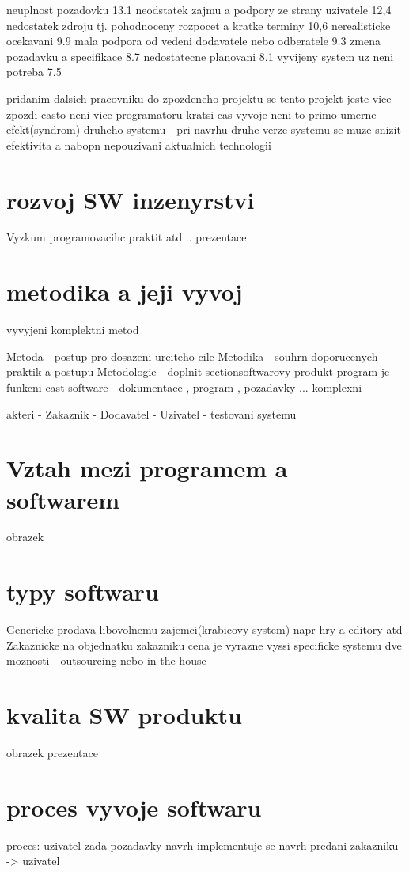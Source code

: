 \documentclass{article}
\begin{document}
neuplnost pozadovku 13.1%
neodstatek zajmu a podpory ze strany uzivatele 12,4%
nedostatek zdroju tj. pohodnoceny rozpocet a kratke terminy 10,6%
nerealisticke ocekavani 9.9%
mala podpora od vedeni dodavatele nebo odberatele 9.3%
zmena pozadavku a specifikace 8.7%
nedostatecne planovani 8.1%
vyvijeny system uz neni potreba 7.5%

pridanim dalsich pracovniku do zpozdeneho projektu se tento projekt jeste vice zpozdi
casto neni vice programatoru kratsi cas vyvoje neni to primo umerne
efekt(syndrom) druheho systemu - pri navrhu druhe verze systemu se muze snizit
efektivita a nabopn
nepouzivani aktualnich technologii
\section{rozvoj SW inzenyrstvi}
Vyzkum programovacihc praktit
atd .. prezentace
\section{metodika a jeji vyvoj}
vyvyjeni komplektni metod

Metoda - postup pro dosazeni urciteho cile
Metodika - souhrn doporucenych praktik a postupu
Metodologie - doplnit
section{softwarovy produkt}
program je funkcni cast
software -  dokumentace , program , pozadavky ... komplexni

akteri - Zakaznik
       - Dodavatel
       - Uzivatel - testovani systemu
\section{Vztah mezi programem a softwarem}
obrazek
\section{typy softwaru}
Genericke
    prodava libovolnemu zajemci(krabicovy system) napr hry a editory atd
Zakaznicke
    na objednatku zakazniku cena je vyrazne vyssi
    specificke systemu
    dve moznosti - outsourcing nebo in the house
\section{kvalita SW produktu}
obrazek prezentace
\section{proces vyvoje softwaru}
proces:
    uzivatel zada pozadavky
    navrh
    implementuje se navrh
    predani zakazniku -> uzivatel
\end{document}
